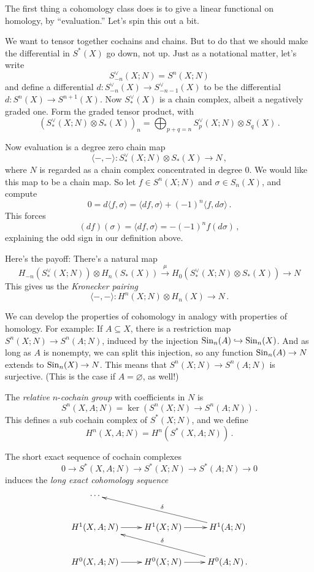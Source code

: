The first thing a cohomology class does is to give a linear functional
on homology, by ``evaluation.'' Let's spin this out a bit. 

We want to tensor together cochains and chains. But to do that we should make
the differential in $S^*(X)$ go down, not up. Just as a notational matter, 
let's write
\[
S^\vee_{-n}(X;N)=S^n(X;N)
\]
and define a differential $d:S^\vee_{-n}(X)\to S^\vee_{-n-1}(X)$ to be the
differential $d:S^n(X)\to S^{n+1}(X)$. Now $S^\vee_\ast(X)$ is a chain
complex, albeit a negatively graded one. Form the graded tensor product, with
\[
\left(S^\vee_\ast(X;N)\otimes S_\ast(X)\right)_n=
\bigoplus_{p+q=n}S^\vee_p(X;N)\otimes S_q(X)\,.
\]

Now evaluation is a degree zero chain map
\[
\langle-,-\rangle:S^\vee_\ast(X;N)\otimes S_\ast(X)\to N\,,
\]
where $N$ is regarded as a chain complex concentrated in degree 0.
We would like this map to be a chain map. So let $f\in S^n(X;N)$ and 
$\sigma\in S_n(X)$, and compute
\[
0 = d\langle f,\sigma\rangle=
\langle df,\sigma\rangle+(-1)^n\langle f,d\sigma\rangle\,.
\]
This forces 
\[
(df)(\sigma)=\langle df,\sigma\rangle=-(-1)^nf(d\sigma)\,,
\]
explaining the odd sign in our definition above. 

Here's the payoff: There's a natural map 
\[
H_{-n}(S^\vee_\ast(X;N))\otimes H_n(S_\ast(X))\xrightarrow{\mu} 
H_0\left(S^\vee_\ast(X;N)\otimes S_\ast(X)\right)\to N
\]
This gives us the {\em Kronecker pairing}
\[
\langle-,-\rangle:H^n(X;N)\otimes H_n(X)\to N\,.
\]

We can develop the properties of cohomology in analogy with properties
of homology. For example:
If $A\subseteq X$, there is a restriction map $S^n(X;N)\to S^n(A;N)$, induced by the injection $\mathrm{Sin}_n(A)\hookrightarrow \mathrm{Sin}_n(X)$. 
And as long as $A$ is nonempty, we can split this injection, so any function $\mathrm{Sin}_n(A)\to N$ extends to $\mathrm{Sin}_n(X)\to N$. This means that $S^n(X;N)\to S^n(A;N)$ is surjective. (This is the case if $A=\varnothing$, as well!) 
\begin{definition} The {\em relative} $n$-{\em cochain group} with coefficients in $N$ is
\[
S^n(X,A;N)=\ker\left(S^n(X;N)\to S^n(A;N)\right)\,.
\]
This defines a sub cochain complex of $S^\ast(X;N)$, and we define
\[
H^n(X,A;N)=H^n(S^\ast(X,A;N))\,.
\]
\end{definition}

The short exact sequence of cochain complexes
\[
0\to S^\ast(X,A;N)\to S^\ast(X;N)\to S^\ast(A;N)\to0
\]
induces the {\em long exact cohomology sequence}
\begin{equation*}
\xymatrix{
	\cdots & & \\
	 H^1(X,A;N)\ar[r] & H^1(X;N)\ar[r] & H^1(A;N)\ar[ull]_{\delta}\\
	 H^0(X,A;N)\ar[r] & H^0(X;N)\ar[r] & H^0(A;N)\ar[ull]_{\delta}\,.
}
\end{equation*}

